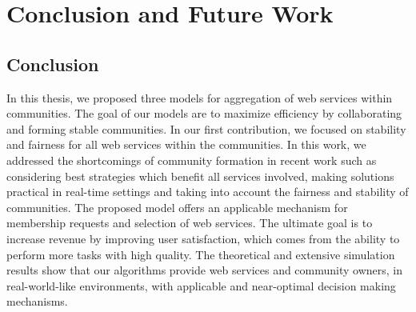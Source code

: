\chapter{Conclusion and Future Work}\label{Chap5:Conclusion}

\section{Conclusion}

In this thesis, we proposed three models for aggregation of web services within communities. The goal of our models are to maximize efficiency by collaborating and forming stable communities. In our first contribution, we focused on stability and fairness for all web services within the communities. In this work, we addressed the shortcomings of community formation in recent work such as considering best strategies which benefit all services involved, making solutions practical in real-time settings and taking into account the fairness and stability of communities. The proposed model offers an applicable mechanism for membership requests and selection of web services. The ultimate goal is to increase revenue by improving user satisfaction, which comes from the ability to perform more tasks with high quality. The theoretical and extensive simulation results show that our algorithms provide web services and community owners, in real-world-like environments, with applicable and near-optimal decision making mechanisms.

